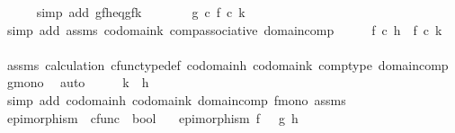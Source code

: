 \begin{isabellebody}
\ \ \ \ \isamarkupfalse%
\ {\isacharparenleft}{\kern0pt}simp\ add{\isacharcolon}{\kern0pt}\ gfh{\isacharunderscore}{\kern0pt}eq{\isacharunderscore}{\kern0pt}gfk{\isacharparenright}{\kern0pt}\isanewline
\ \ \isamarkupfalse%
\ \isamarkupfalse%
\ {\isachardoublequoteopen}{\isachardot}{\kern0pt}{\isachardot}{\kern0pt}{\isachardot}{\kern0pt}\ {\isacharequal}{\kern0pt}\ g\ {\isasymcirc}\isactrlsub c\ {\isacharparenleft}{\kern0pt}f\ {\isasymcirc}\isactrlsub c\ k{\isacharparenright}{\kern0pt}{\isachardoublequoteclose}\isanewline
\ \ \ \ \isamarkupfalse%
\ {\isacharparenleft}{\kern0pt}simp\ add{\isacharcolon}{\kern0pt}\ assms\ codomain{\isacharunderscore}{\kern0pt}k\ comp{\isacharunderscore}{\kern0pt}associative\ domain{\isacharunderscore}{\kern0pt}comp{\isacharparenright}{\kern0pt}\isanewline
\ \ \isamarkupfalse%
\ \isamarkupfalse%
\ {\isachardoublequoteopen}f\ {\isasymcirc}\isactrlsub c\ h\ {\isacharequal}{\kern0pt}\ f\ {\isasymcirc}\isactrlsub c\ k{\isachardoublequoteclose}\isanewline
\ \ \ \ \isamarkupfalse%
\ assms\ calculation\ cfunc{\isacharunderscore}{\kern0pt}type{\isacharunderscore}{\kern0pt}def\ codomain{\isacharunderscore}{\kern0pt}h\ codomain{\isacharunderscore}{\kern0pt}k\ comp{\isacharunderscore}{\kern0pt}type\ domain{\isacharunderscore}{\kern0pt}comp\ g{\isacharunderscore}{\kern0pt}mono\ \isamarkupfalse%
\ auto\isanewline
\ \ \isamarkupfalse%
\ \isamarkupfalse%
\ {\isachardoublequoteopen}k\ {\isacharequal}{\kern0pt}\ h{\isachardoublequoteclose}\isanewline
\ \ \ \ \isamarkupfalse%
\ {\isacharparenleft}{\kern0pt}simp\ add{\isacharcolon}{\kern0pt}\ codomain{\isacharunderscore}{\kern0pt}h\ codomain{\isacharunderscore}{\kern0pt}k\ domain{\isacharunderscore}{\kern0pt}comp\ f{\isacharunderscore}{\kern0pt}mono\ assms{\isacharparenright}{\kern0pt}\isanewline
{}\isamarkupfalse%
%
\endisatagproof
{\isafoldproof}%
%
\isadelimproof
%
\endisadelimproof
%
\isadelimdocument
%
\endisadelimdocument
%
\isatagdocument
%
\isamarkuptrue%
%
\endisatagdocument
{\isafolddocument}%
%
\isadelimdocument
%
\endisadelimdocument
{}\isamarkupfalse%
\ epimorphism\ {\isacharcolon}{\kern0pt}{\isacharcolon}{\kern0pt}\ {\isachardoublequoteopen}cfunc\ {\isasymRightarrow}\ bool{\isachardoublequoteclose}\ \isanewline
\ \ {\isachardoublequoteopen}epimorphism\ f\ {\isasymlongleftrightarrow}\ {\isacharparenleft}{\kern0pt}{\isasymforall}\ g\ h{\isachardot}{\kern0pt}\ \isanewline

\end{isabellebody}
